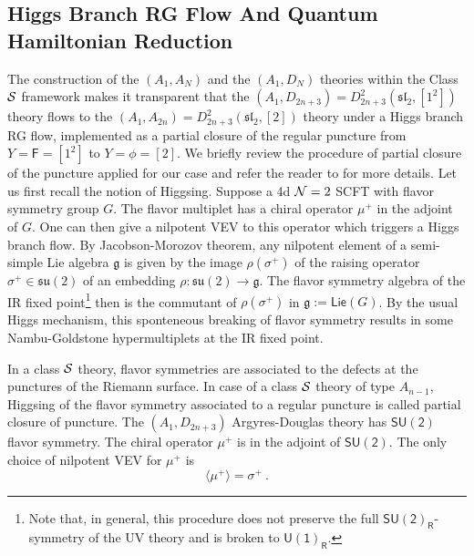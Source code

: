 \documentclass[a4paper,10pt]{article}
\newcommand{\mr}[1]{\mathsf{#1}}
\newcommand{\tsf}[1]{\textsf{#1}}
\newcommand{\mf}[1]{\mathfrak{#1}}
\def\CN {{\cal N}}
\def\CS {{\cal S}}
\begin{document}
\subsection{Higgs Branch \tsf{RG} Flow And Quantum Hamiltonian Reduction}\label{sec:RG_flow}
The construction of the $(A_1,A_N)$ and the $(A_1,D_N)$ theories within the Class $\CS$ framework makes it transparent that the $(A_1,D_{2n+3})=D_{2n+3}^2(\mf{sl}_2,[1^2])$ theory flows to the $(A_1,A_{2n})=D_{2n+3}^2(\mf{sl}_2,[2])$ theory under a Higgs branch \tsf{RG} flow, implemented as a partial closure of the regular puncture from $Y=\mr{F}=[1^2]$ to $Y=\phi=[2]$. We briefly review the procedure of partial closure of the puncture applied for our case and refer the reader to \cite{Tachikawa:2015bga} for more details. Let us first recall the notion of Higgsing. Suppose a 4d $\CN=2$ \tsf{SCFT} with flavor symmetry group $G$. The flavor multiplet has a chiral operator $\mu^+$ in the adjoint of $G$. One can then give a nilpotent \tsf{VEV} to this operator which triggers a Higgs branch flow. By Jacobson-Morozov theorem, any nilpotent element of a semi-simple Lie
algebra $\mf{g}$ is given by the image $\rho(\sigma^+)$ of the raising operator $\sigma^+\in\mf{su}(2)$ of an embedding $\rho: \mf{su}(2) \longrightarrow \mf{g}$. The flavor symmetry algebra of the \tsf{IR} fixed point\footnote{Note that, in general, this procedure does not preserve the full $\mr{SU(2)_R}$-symmetry of the \tsf{UV} theory and is broken to $\mr{U(1)_R}$.} then is the commutant of $\rho(\sigma^+)$ in $\mf{g}:=\mr{Lie}(G)$. By the usual Higgs mechanism, this sponteneous breaking of flavor symmetry results in some Nambu-Goldstone hypermultiplets at the \tsf{IR} fixed point. 
\par In a class $\CS$ theory, flavor symmetries are associated to the defects at the punctures of the Riemann surface. In case of a class $\CS$ theory of type $A_{n-1}$, Higgsing of the flavor symmetry associated to a regular puncture is called partial closure of puncture. The $(A_1,D_{2n+3})$ Argyres-Douglas theory has $\mr{SU(2)}$ flavor symmetry. The chiral operator $\mu^+$ is in the adjoint of $\mr{SU(2)}$. The only choice of nilpotent \tsf{VEV} for $\mu^+$ is
\begin{equation}
    \langle\mu^+\rangle=\sigma^+~.
\end{equation}
\end{document}
